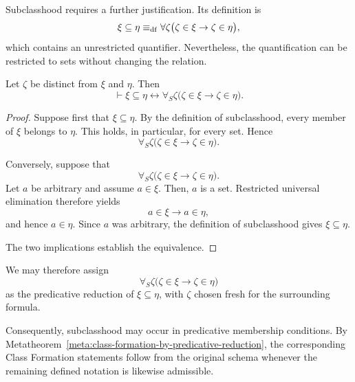 Subclasshood requires a further justification. Its definition is
\[
\xi\subseteq\eta
\mathrel{\equiv_{\mathrm{df}}}
\forall\zeta
\bigl(
\zeta\in\xi\to\zeta\in\eta
\bigr),
\]
which contains an unrestricted quantifier. Nevertheless, the quantification can be restricted to sets without changing the relation.

\begin{metatheorem}
\label{meta:predicative-reduction-of-subclasshood}
Let \(\zeta\) be distinct from \(\xi\) and \(\eta\). Then
\[
\vdash
\xi\subseteq\eta
\leftrightarrow
\forall_S\zeta
\bigl(
\zeta\in\xi\to\zeta\in\eta
\bigr).
\]
\end{metatheorem}

\begin{proof}
Suppose first that \(\xi\subseteq\eta\). By the definition of subclasshood, every member of \(\xi\) belongs to \(\eta\). This holds, in particular, for every set. Hence
\[
\forall_S\zeta
\bigl(
\zeta\in\xi\to\zeta\in\eta
\bigr).
\]

Conversely, suppose that
\[
\forall_S\zeta
\bigl(
\zeta\in\xi\to\zeta\in\eta
\bigr).
\]
Let \(a\) be arbitrary and assume \(a\in\xi\). Then, $a$ is a set. Restricted universal elimination therefore yields
\[
a\in\xi\to a\in\eta,
\]
and hence \(a\in\eta\). Since \(a\) was arbitrary, the definition of subclasshood gives \(\xi\subseteq\eta\).

The two implications establish the equivalence.
\end{proof}

We may therefore assign
\[
\forall_S\zeta
\bigl(
\zeta\in\xi\to\zeta\in\eta
\bigr)
\]
as the predicative reduction of \(\xi\subseteq\eta\), with \(\zeta\) chosen fresh for the surrounding formula.

Consequently, subclasshood may occur in predicative membership conditions. By Metatheorem~\ref{meta:class-formation-by-predicative-reduction}, the corresponding Class Formation statements follow from the original schema whenever the remaining defined notation is likewise admissible.
